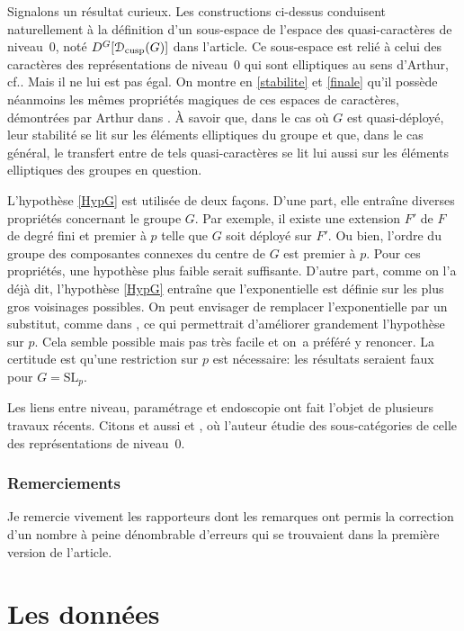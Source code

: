 \documentclass[11pt]{article}
\newcommand{\cf}{cf.\xspace}
\numberwithin{equation}{section}\providecommand{\og}{«\,}\providecommand{\fg}{\,»}
\let\mathcal \EuScript
\let\oldS\S
\renewcommand{\S}{\oldS\,}
\newcommand{\cusp}{\mathrm{cusp}}
\newcommand{\cD}{\mathcal{D}}
\theoremstyle{plain}
\theoremstyle{definition}
\begin{document}
Signalons un résultat curieux. Les constructions ci-dessus conduisent naturellement à la définition d'un sous-espace de l'espace des quasi-caractères de niveau~$0$, noté $D^G[\cD_{\cusp}(G)]$ dans l'article. Ce sous-espace est relié à celui des caractères des représentations de niveau~$0$ qui sont elliptiques au sens d'Arthur, \cf \cite{A2}. Mais il ne lui est pas égal. On montre en \ref{stabilite} et \ref{finale} qu'il possède néanmoins les mêmes propriétés magiques de ces espaces de caractères, démontrées par Arthur dans \cite{A3}. À savoir que, dans le cas où $G$ est quasi-déployé, leur stabilité se lit sur les éléments elliptiques du groupe et que, dans le cas général, le transfert entre de tels quasi-caractères se lit lui aussi sur les éléments elliptiques des groupes en question.

L'hypothèse \ref{HypG} est utilisée de deux façons. D'une part, elle entraîne diverses propriétés concernant le groupe $G$. Par exemple, il existe une extension $F'$ de $F$ de degré fini et premier à $p$ telle que $G$ soit déployé sur $F'$. Ou bien, l'ordre du groupe des composantes connexes du centre de $G$ est premier à $p$. Pour ces propriétés, une hypothèse plus faible serait suffisante. D'autre part, comme on l'a déjà dit, l'hypothèse \ref{HypG} entraîne que l'exponentielle est définie sur les plus gros voisinages possibles. On peut envisager de remplacer l'exponentielle par un substitut, comme dans \cite[\S1.8]{KV}, ce qui permettrait d'améliorer grandement l'hypothèse sur $p$. Cela semble possible mais pas très facile et on~a préféré y renoncer. La certitude est qu'une restriction sur $p$ est nécessaire: les résultats seraient faux pour $G=\mathrm{SL}_{p}$.

Les liens entre niveau, paramétrage et endoscopie ont fait l'objet de plusieurs travaux récents. Citons \cite{Oi} et aussi \cite{Lanard1} et \cite{Lanard2}, où l'auteur étudie des sous-catégories de celle des représentations de niveau~$0$.

\subsubsection*{Remerciements}
Je remercie vivement les rapporteurs dont les remarques ont permis la correction d'un nombre à peine dénombrable d'erreurs qui se trouvaient dans la première version de l'article.

\section{Les données}
\end{document}

